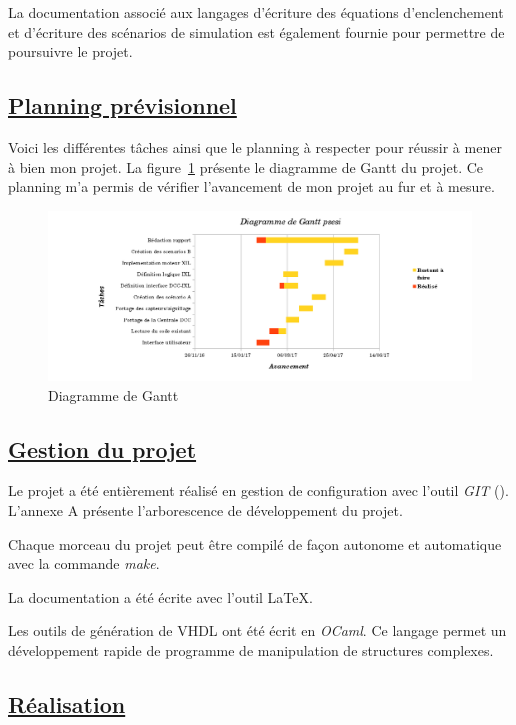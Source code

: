 La documentation associ\'e aux langages d'\'ecriture des \'equations
d'enclenchement et d'\'ecriture des sc\'enarios de simulation est
\'egalement fournie pour permettre de poursuivre le projet.


\newpage

\subsection{\underline{Planning pr\'evisionnel}}
\label{sec:planning}

Voici les différentes t\^aches ainsi que le planning à
respecter pour r\'eussir \`a mener \`a bien mon projet. La
figure~\ref{gantt} pr\'esente le diagramme de Gantt du projet. Ce planning m'a permis de vérifier l'avancement de mon projet au fur et à mesure.

\begin{figure}[h]
\centering
\includegraphics[scale=0.5]{gantt.png}
\caption{Diagramme de Gantt}
\label{gantt}
\end{figure}

\subsection{\underline{Gestion du projet}}
\label{sec:gestion}

Le projet a \'et\'e enti\`erement r\'ealis\'e en gestion de configuration avec l'outil \emph{GIT} (\cite{GIT}). L'annexe A pr\'esente l'arborescence de d\'eveloppement du projet.

Chaque morceau du projet peut \^etre compil\'e de fa\c con autonome et
automatique avec la commande \emph{make}.

La documentation a \'et\'e \'ecrite avec l'outil \LaTeX.

Les outils de g\'en\'eration de VHDL ont \'et\'e \'ecrit en \emph{OCaml}. Ce
langage permet un d\'eveloppement rapide de programme de manipulation de
structures complexes.


\subsection{\underline{Réalisation}}
\label{sec:Réal}

